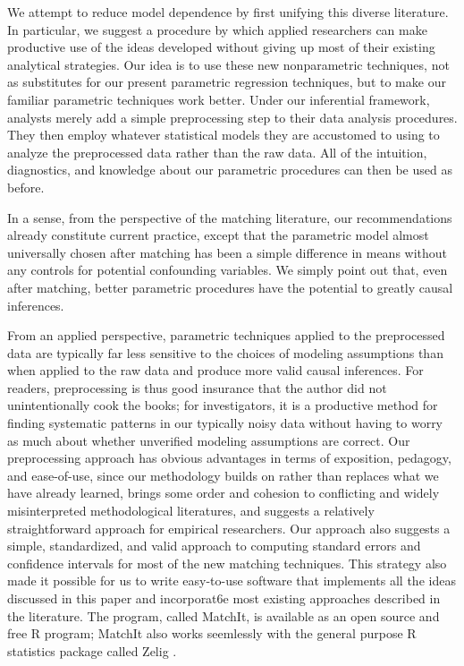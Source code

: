 \documentclass[11pt,titlepage]{article}
\begin{document}
We attempt to reduce model dependence by first unifying this diverse
literature.  In particular, we suggest a procedure by which applied
researchers can make productive use of the ideas developed without
giving up most of their existing analytical strategies.  Our idea is
to use these new nonparametric techniques, not as substitutes for our
present parametric regression techniques, but to make our familiar
parametric techniques work better.  Under our inferential framework,
analysts merely add a simple preprocessing step to their data analysis
procedures.  They then employ whatever statistical models they are
accustomed to using to analyze the preprocessed data rather than the
raw data.  All of the intuition, diagnostics, and knowledge about our
parametric procedures can then be used as before.  

In a sense, from the perspective of the matching literature, our
recommendations already constitute current practice, except that the
parametric model almost universally chosen after matching has been a
simple difference in means without any controls for potential
confounding variables.  We simply point out that, even after matching,
better parametric procedures have the potential to greatly causal
inferences.

From an applied perspective, parametric techniques applied to the
preprocessed data are typically far less sensitive to the choices of
modeling assumptions than when applied to the raw data and produce
more valid causal inferences.  For readers, preprocessing is thus good
insurance that the author did not unintentionally cook the books; for
investigators, it is a productive method for finding systematic
patterns in our typically noisy data without having to worry as much
about whether unverified modeling assumptions are correct.  Our
preprocessing approach has obvious advantages in terms of exposition,
pedagogy, and ease-of-use, since our methodology builds on rather than
replaces what we have already learned, brings some order and cohesion
to conflicting and widely misinterpreted methodological literatures,
and suggests a relatively straightforward approach for empirical
researchers. Our approach also suggests a simple, standardized, and
valid approach to computing standard errors and confidence intervals
for most of the new matching techniques.  This strategy also made it
possible for us to write easy-to-use software that implements all the
ideas discussed in this paper and incorporat6e most existing
approaches described in the literature.  The program, called MatchIt,
is available as an open source and free R program; MatchIt also works
seemlessly with the general purpose R statistics package called Zelig
\citep{ImaKinLau04}.
\end{document}
